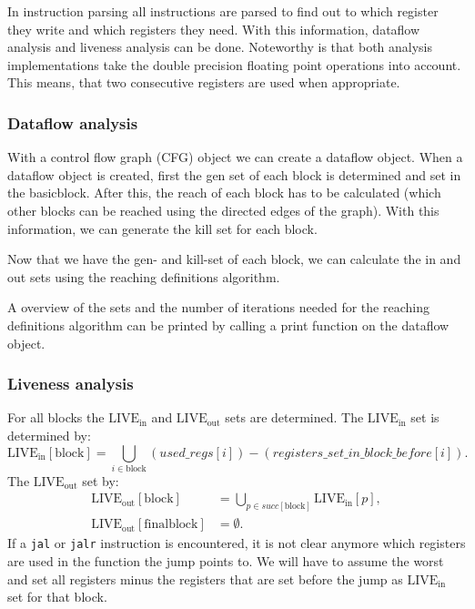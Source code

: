 In instruction parsing all instructions are parsed to find out to which
register they write and which registers they need. With this information,
dataflow analysis and liveness analysis can be done. Noteworthy is that both
analysis implementations take the double precision floating point 
operations into account. This means, that two consecutive registers are used when 
appropriate.
\subsubsection{Dataflow analysis}
With a control flow graph (CFG) object we can create a dataflow object. When a 
dataflow object is created, first the gen set of each block is determined and 
set in the basicblock. After this, the reach of each block has to be calculated
(which other blocks can be reached using the directed edges of the graph). With 
this information, we can generate the kill set for each block.

Now that we have the gen- and kill-set of each block, we can calculate the
in and out sets using the reaching definitions algorithm.

A overview of the sets and the number of iterations needed for the reaching 
definitions algorithm can be printed by calling a print function on the dataflow
object.
\subsubsection{Liveness analysis}
For all blocks the $\text{LIVE}_\text{in}$ and $\text{LIVE}_\text{out}$ sets are determined.
The $\text{LIVE}_\text{in}$ set is determined by:
\[
\text{LIVE}_\text{in}[\text{block}] = \bigcup_{i \in \text{block}}(used\_regs[i]) - (registers\_set\_in\_block\_before[i]).
\]
The $\text{LIVE}_\text{out}$ set by:
\begin{align*}
\text{LIVE}_\text{out}[\text{block}]		&= \bigcup_{p \in succ[\text{block}]} \text{LIVE}_\text{in}[p],\\
\text{LIVE}_\text{out}[\text{finalblock}]	&= \emptyset.
\end{align*}
If a \texttt{jal} or \texttt{jalr} instruction is encountered, it is not clear 
anymore which registers are used in the function the jump points to. We will 
have to assume the worst and set all registers minus the registers that
are set before the jump as $\text{LIVE}_\text{in}$ set for that block.
